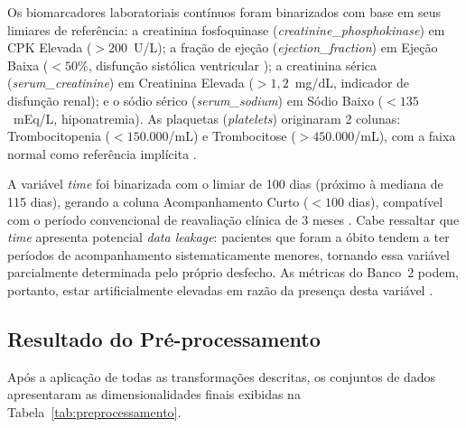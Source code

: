 Os biomarcadores laboratoriais contínuos foram binarizados com base em seus limiares de referência: a creatinina fosfoquinase (\textit{creatinine\_phosphokinase}) em CPK Elevada ($> 200$~U/L); a fração de ejeção (\textit{ejection\_fraction}) em Ejeção Baixa ($< 50\%$, disfunção sistólica ventricular \cite{rohde2018}); a creatinina sérica (\textit{serum\_creatinine}) em Creatinina Elevada ($> 1{,}2$~mg/dL, indicador de disfunção renal); e o sódio sérico (\textit{serum\_sodium}) em Sódio Baixo ($< 135$~mEq/L, hiponatremia). As plaquetas (\textit{platelets}) originaram 2 colunas: Trombocitopenia ($< 150{.}000$/mL) e Trombocitose ($> 450{.}000$/mL), com a faixa normal como referência implícita \cite{porto2019}.

A variável \textit{time} foi binarizada com o limiar de 100 dias (próximo à mediana de 115 dias), gerando a coluna Acompanhamento Curto ($< 100$ dias), compatível com o período convencional de reavaliação clínica de 3 meses \cite{rohde2018}. Cabe ressaltar que \textit{time} apresenta potencial \textit{data leakage}: pacientes que foram a óbito tendem a ter períodos de acompanhamento sistematicamente menores, tornando essa variável parcialmente determinada pelo próprio desfecho. As métricas do Banco~2 podem, portanto, estar artificialmente elevadas em razão da presença desta variável \cite{chicco2020}.

\subsection{Resultado do Pré-processamento}

Após a aplicação de todas as transformações descritas, os conjuntos de dados apresentaram as dimensionalidades finais exibidas na Tabela~\ref{tab:preprocessamento}.

